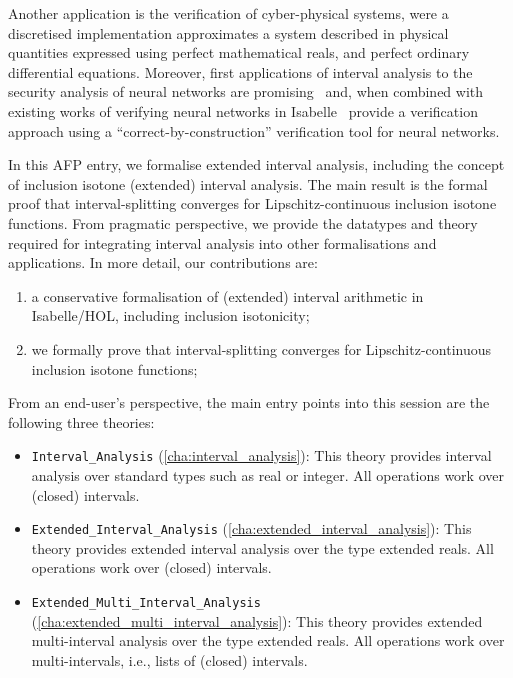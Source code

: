 \documentclass[11pt,DIV=13,a4paper,abstract=true,twoside=semi,openright]
{scrreprt}
\begin{document}
Another application is the verification of cyber-physical systems, were a
discretised implementation approximates a system described in physical
quantities expressed using perfect mathematical reals, and perfect ordinary
differential equations.  Moreover, first applications of interval analysis to the
security analysis of neural networks are
promising~\cite{wang.ea:formal-security:2018,harapanahalli.ea:toolbox:2023} and, 
when combined with existing works of verifying neural networks in 
Isabelle~\cite{brucker.ea:feedforward-nn-verification:2023} provide a verification 
approach using a ``correct-by-construction'' verification tool for neural networks. 

In this AFP entry, we formalise extended interval analysis,  including the
concept of inclusion isotone (extended) interval analysis. The main result
is the formal proof that interval-splitting converges for Lipschitz-continuous 
inclusion isotone functions. From pragmatic perspective, we provide the 
datatypes and theory required for integrating interval analysis into
other formalisations and applications.  In more detail, our contributions
are:
\begin{enumerate}
  \item a conservative formalisation of (extended) interval arithmetic in
  Isabelle/HOL, including inclusion isotonicity;
  \item we formally prove that interval-splitting converges for
  Lipschitz-continuous inclusion isotone functions;
\end{enumerate}

From an end-user's perspective, the main entry points into this session 
are the following three theories:
\begin{itemize}
\item \texttt{Interval\_Analysis} (\autoref{cha:interval_analysis}):
      This theory provides interval analysis over standard types such as real or integer. All operations 
      work over (closed) intervals. 
\item \texttt{Extended\_Interval\_Analysis} (\autoref{cha:extended_interval_analysis}):
      This theory provides extended interval analysis over the type extended reals. All operations 
      work over (closed) intervals.
\item \texttt{Extended\_Multi\_Interval\_Analysis} (\autoref{cha:extended_multi_interval_analysis}):
      This theory provides extended multi-interval analysis over the type extended reals. All operations 
      work over multi-intervals, i.e., lists of (closed) intervals. 
\end{itemize}
\end{document}
